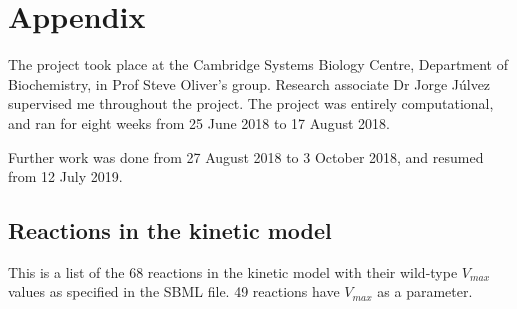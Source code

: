 \documentclass[parskip=full, numbers=noenddot]{scrreprt}
\begin{document}

\appendix
\chapter*{Appendix}
\renewcommand{\thesection}{\Alph{section}}

The project took place at the Cambridge Systems Biology Centre, Department of Biochemistry, in Prof Steve Oliver's group. Research associate Dr Jorge J\'ulvez supervised me throughout the project. The project was entirely computational, and ran for eight weeks from 25 June 2018 to 17 August 2018.

Further work was done from 27 August 2018 to 3 October 2018, and resumed from 12 July 2019.

\section{Reactions in the kinetic model}
\label{ap:kineticreactionlist}

This is a list of the 68 reactions in the kinetic model with their wild-type $V_{max}$ values as specified in the SBML file. 49 reactions have $V_{max}$ as a parameter.
\end{document}
